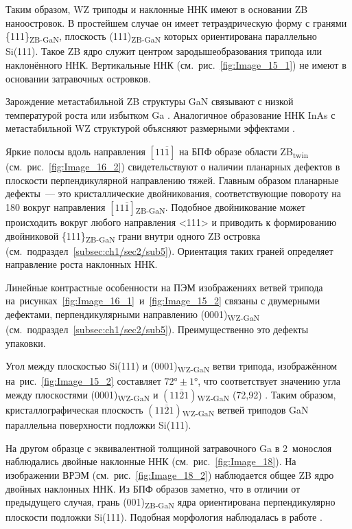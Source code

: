 Таким образом, WZ триподы и наклонные ННК имеют в основании ZB наноостровок. В
простейшем случае он имеет тетраэдрическую форму с гранями
\{111\}\textsubscript{ZB-GaN}, плоскость (111)\textsubscript{ZB-GaN} которых
ориентирована параллельно Si(111). Такое ZB ядро служит центром
зародышеобразования трипода или наклонённого ННК. Вертикальные ННК
(см.~рис.~\cref{fig:Image_15_1}) не имеют в основании затравочных островков.

Зарождение метастабильной ZB структуры GaN связывают с низкой температурой
роста или избытком Ga \cite{Shi2006, Romano1997}. Аналогичное образование ННК
InAs с метастабильной WZ структурой объясняют размерными эффектами
\cite{Johansson2010}.

Яркие полосы вдоль направления \([11\overline{1}]\) на БПФ образе области
ZB\textsubscript{twin} (см.~рис.~\cref{fig:Image_16_2}) свидетельствуют о
наличии планарных дефектов в плоскости перпендикулярной направлению тяжей.
Главным образом планарные дефекты~--- это кристаллические двойникования,
соответствующие повороту на 180{\textdegree} вокруг направления
\([11\overline{1}]\)\textsubscript{ZB-GaN}. Подобное двойникование может
происходить вокруг любого направления <111> \cite{Suturin2017} и приводить к
формированию двойниковой \{111\}\textsubscript{ZB-GaN} грани внутри одного ZB
островка (см.~подраздел~\cref{subsec:ch1/sec2/sub5}). Ориентация таких граней
определяет направление роста наклонных ННК.

Линейные контрастные особенности на ПЭМ изображениях ветвей трипода
на~рисунках~\cref{fig:Image_16_1}~и~\cref{fig:Image_15_2} связаны с двумерными
дефектами, перпендикулярными направлению (0001)\textsubscript{WZ-GaN}
(см.~подраздел~\cref{subsec:ch1/sec2/sub5}). Преимущественно это дефекты
упаковки.

Угол между плоскостью Si(111) и (0001)\textsubscript{WZ-GaN} ветви трипода,
изображённом на~рис.~\cref{fig:Image_15_2} составляет \(72\si{\degree} \pm
1\si{\degree}\), что соответствует значению угла между плоскостями
(0001)\textsubscript{WZ-GaN} и \((11\overline{2}1)\)\textsubscript{WZ-GaN}
(72,92\textdegree) \cite{Wang2016}. Таким образом, кристаллографическая
плоскость \((11\overline{2}1)\)\textsubscript{WZ-GaN} ветвей триподов GaN
параллельна поверхности подложки Si(111).

На другом образце с эквивалентной толщиной затравочного Ga в 2~монослоя
наблюдались двойные наклонные ННК (см.~рис.~\cref{fig:Image_18}). На
изображении ВРЭМ (см.~рис.~\cref{fig:Image_18_2}) наблюдается общее ZB ядро
двойных наклонных ННК. Из БПФ образов заметно, что в отличии от предыдущего
случая, грань (001)\textsubscript{ZB-GaN} ядра ориентирована перпендикулярно
плоскости подложки Si(111). Подобная морфология наблюдалась в работе
\cite{Wang2017}.

